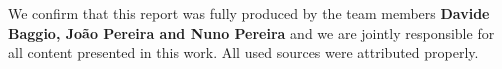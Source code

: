 \begin{center}
    We confirm that this report was fully produced by the team members \textbf{Davide Baggio, João Pereira and Nuno Pereira} and we are jointly responsible for all content presented in this work. All used sources were attributed properly.

\end{center}